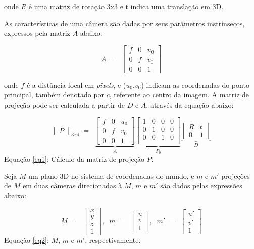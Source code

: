 \noindent
onde $R$ é uma matriz de rotação 3x3 e t indica uma translação em 3D.

As características de uma câmera são dadas por seus parâmetros instrínsecos, expressos pela matriz $A$ abaixo:

\begin{equation}
A \; = \; \;
\begin{bmatrix}
		f & 0 & u_{0} \\
		0 & f & v_{0} \\
		0 & 0 & 1
\end{bmatrix}
\end{equation}

\noindent
onde $f$ é a distância focal em \textit{pixels}, e ($u_{0}$,$v_{0}$) indicam as coordenadas do ponto principal, também denotado por $c$, referente ao centro da imagem.
A matriz de projeção pode ser calculada a partir de $D$ e $A$, através da equação abaixo:

\begin{equation}\label{eq1}
\begin{bmatrix}
		P
\end{bmatrix}_{3x4}	\; = \; \;
\underbrace{\begin{bmatrix}
		f & 0 & u_{0} \\
		0 & f & v_{0} \\
		0 & 0 & 1
\end{bmatrix}
}_{A}
\underbrace{\begin{bmatrix}
		1&0&0&0 \\
		0&1&0&0 \\
		0&0&1&0 \\
\end{bmatrix}}_{P_{0}}	
\underbrace{\begin{bmatrix}
		R & t \\
		0 & 1		
	\end{bmatrix}}_{D}
\end{equation}
Equação \eqref{eq1}: Cálculo da matriz de projeção $P$.

Seja $M$ um plano 3D no sistema de coordenadas do mundo, e $m$ e $m'$ projeções de $M$ em duas câmeras direcionadas à $M$, $m$ e $m'$ são dados pelas expressões abaixo:

\begin{equation}\label{eq2}
M \; = \; \;
\begin{bmatrix}
x \\ y \\ z \\ 1
\end{bmatrix}, \; \;
m \; = \; \;
\begin{bmatrix}
u \\ v \\ 1
\end{bmatrix}, \;\;
m' \; = \; \;
\begin{bmatrix}
u' \\ v' \\ 1
\end{bmatrix}
\end{equation}
Equação \eqref{eq2}: $M$, $m$ e $m'$, respectivamente.

